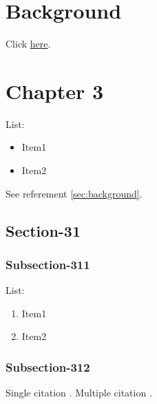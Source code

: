 \documentclass[a4paper,10pt]{report}
\begin{document}
\chapter{Background}\label{chap:background}

Click \href{https://github.com/}{here}.
\blindtext %


\chapter{Chapter 3}\label{chap:chapter-3}

List:
\begin{itemize}
  \item Item1
  \item Item2
\end{itemize}

See referement \ref{sec:background}.


\section{Section-31}\label{sec:sec-31}
\subsection{Subsection-311}\label{subsec:subsection-311}

List:
\begin{enumerate}
  \item Item1
  \item Item2
\end{enumerate}

\subsection{Subsection-312}\label{subsec:subsection-312}

Single citation \cite{knuth74}. 
Multiple citation \cite{knuth92,lamport94}.
\end{document}
